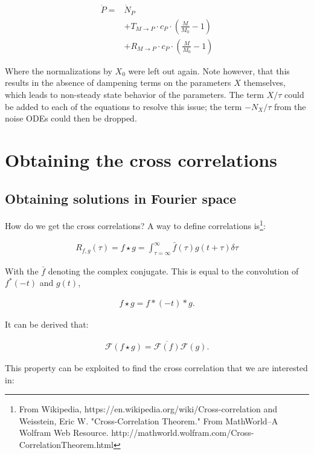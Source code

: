 \documentclass[a4paper,twoside,10pt]{report}
\begin{document}
\begin{align}
\dot{P} = & \dot{N}_P \nonumber \\ 
& + T_{M\rightarrow P} \cdot c_P \cdot (\frac{M}{M_0}-1)  \nonumber \\ 
& + R_{M\rightarrow P} \cdot c_P \cdot (\frac{M}{M_0}-1)
\end{align}

Where the normalizations by $X_0$ were left out again.
Note however, that this results in the absence of dampening terms on the parameters $X$ themselves, which leads to non-steady state behavior of the parameters.
The term $X/\tau$ could be added to each of the equations to resolve this issue; the term $-N_X/\tau$ from the noise ODEs could then be dropped.




\section{Obtaining the cross correlations}

\subsection{Obtaining solutions in Fourier space}

How do we get the cross correlations? A way to define correlations is\footnote{From Wikipedia, https://en.wikipedia.org/wiki/Cross-correlation and Weisstein, Eric W. "Cross-Correlation Theorem." From MathWorld--A Wolfram Web Resource. http://mathworld.wolfram.com/Cross-CorrelationTheorem.html}:

\begin{align}
R_{f,g}(\tau) = f \star g = \int_{\tau=\infty}^{\infty} {\bar f(\tau) g(t+\tau) \delta \tau}
\end{align}

With the $\bar{f}$ denoting the complex conjugate. This is equal to the convolution of $f^*(-t)$ and $g(t)$, 

\begin{align}
f \star g = f*(-t) * g
.
\end{align}

It can be derived that:

\begin{align}
\mathcal{F} (f \star g) = \overline{\mathcal{F} (f)} \mathcal{F}(g)
.
\end{align}

This property can be exploited to find the cross correlation that we are interested in:
\end{document}
